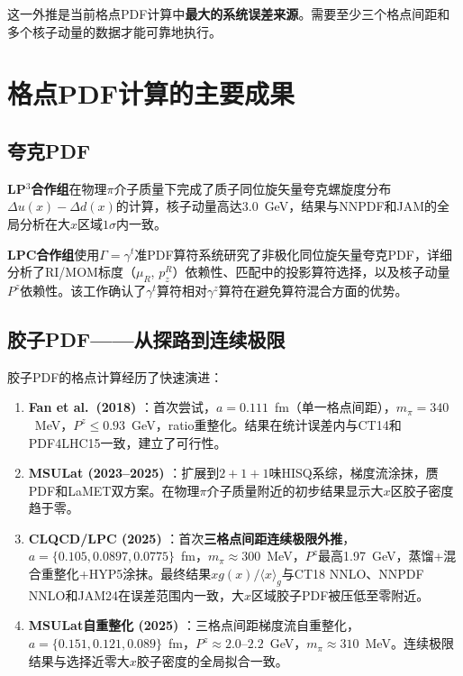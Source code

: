 \documentclass[12pt,a4paper]{ctexart}
\theoremstyle{definition}
\begin{document}
这一外推是当前格点PDF计算中\textbf{最大的系统误差来源}。需要至少三个格点间距和多个核子动量的数据才能可靠地执行。

\section{格点PDF计算的主要成果}

\subsection{夸克PDF}

\textbf{LP$^3$合作组}\cite{LP3helicity,Lin2018}在物理$\pi$介子质量下完成了质子同位旋矢量夸克螺旋度分布$\Delta u(x) - \Delta d(x)$的计算，核子动量高达3.0~GeV，结果与NNPDF和JAM的全局分析在大$x$区域$1\sigma$内一致。

\textbf{LPC合作组}\cite{Liu2019isovector}使用$\Gamma = \gamma^t$准PDF算符系统研究了非极化同位旋矢量夸克PDF，详细分析了RI/MOM标度（$\mu_R$, $p^R_z$）依赖性、匹配中的投影算符选择，以及核子动量$P^z$依赖性。该工作确认了$\gamma^t$算符相对$\gamma^z$算符在避免算符混合方面的优势。

\subsection{胶子PDF——从探路到连续极限}

胶子PDF的格点计算经历了快速演进：

\begin{enumerate}
    \item \textbf{Fan et al.\ (2018)} \cite{Fan2018gluon}：首次尝试，$a = 0.111$~fm（单一格点间距），$m_\pi = 340$~MeV，$P^z \leq 0.93$~GeV，ratio重整化。结果在统计误差内与CT14和PDF4LHC15一致，建立了可行性。

    \item \textbf{MSULat (2023--2025)} \cite{Fan2023,Good2025a,Lin2025gluon}：扩展到$2+1+1$味HISQ系综，梯度流涂抹，赝PDF和LaMET双方案。在物理$\pi$介子质量附近的初步结果显示大$x$区胶子密度趋于零。

    \item \textbf{CLQCD/LPC (2025)} \cite{Chen2025gluon,Chen2025first}：首次\textbf{三格点间距连续极限外推}，$a = \{0.105, 0.0897, 0.0775\}$~fm，$m_\pi \approx 300$~MeV，$P^z$最高1.97~GeV，蒸馏+混合重整化+HYP5涂抹。最终结果$xg(x)/\langle x \rangle_g$与CT18 NNLO、NNPDF NNLO和JAM24在误差范围内一致，大$x$区域胶子PDF被压低至零附近。

    \item \textbf{MSULat自重整化 (2025)} \cite{NieMiera2025}：三格点间距梯度流自重整化，$a = \{0.151, 0.121, 0.089\}$~fm，$P^z \approx 2.0$--$2.2$~GeV，$m_\pi \approx 310$~MeV。连续极限结果与选择近零大$x$胶子密度的全局拟合一致。
\end{enumerate}
\end{document}
